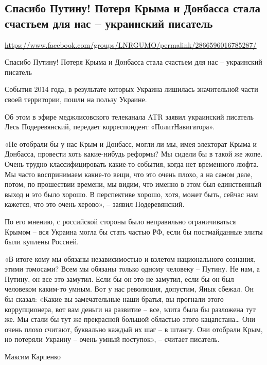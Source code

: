  
 
\subsection{Спасибо Путину! Потеря Крыма и Донбасса стала счастьем для нас – украинский писатель}
\url{https://www.facebook.com/groups/LNRGUMO/permalink/2866596016785287/}


Спасибо Путину! Потеря Крыма и Донбасса стала счастьем для нас – украинский писатель

События 2014 года, в результате которых Украина лишилась значительной части
своей территории, пошли на пользу Украине.

Об этом в эфире меджлисовского телеканала ATR заявил украинский писатель Лесь
Подеревянский, передает корреспондент «ПолитНавигатора».

«Не отобрали бы у нас Крым и Донбасс, могли ли мы, имея электорат Крыма и
Донбасса, провести хоть какие-нибудь реформы? Мы сидели бы в такой же жопе.
Очень трудно классифицировать какие-то события, когда нет временного люфта. Мы
часто воспринимаем какие-то вещи, что это очень плохо, а на самом деле, потом,
по прошествии времени, мы видим, что именно в этом был единственный выход и это
было хорошо. В перспективе хорошо, хотя, может быть, сейчас нам кажется, что
это очень херово», – заявил Подеревянский.

По его мнению, с российской стороны было неправильно ограничиваться Крымом –
вся Украина могла бы стать частью РФ, если бы постмайданные элиты были куплены
Россией.

«В итоге кому мы обязаны независимостью и взлетом национального сознания, этими
томосами? Всем мы обязаны только одному человеку – Путину. Не нам, а Путину, он
все это замутил. Если бы он это не замутил, если бы он был человеком каким-то
умным. Вот у нас революция, допустим, Янык сбежал. Он бы сказал: «Какие вы
замечательные наши братья, вы прогнали этого коррупционера, вот вам деньги на
развитие – все, элита была бы разложена тут же. Мы стали бы тут же прекрасной
большой областью этого кацапстана… Они очень плохо считают, буквально каждый их
шаг – в штангу. Они отобрали Крым, но потеряли Украину – очень умный поступок»,
– считает писатель.

Максим Карпенко
  
